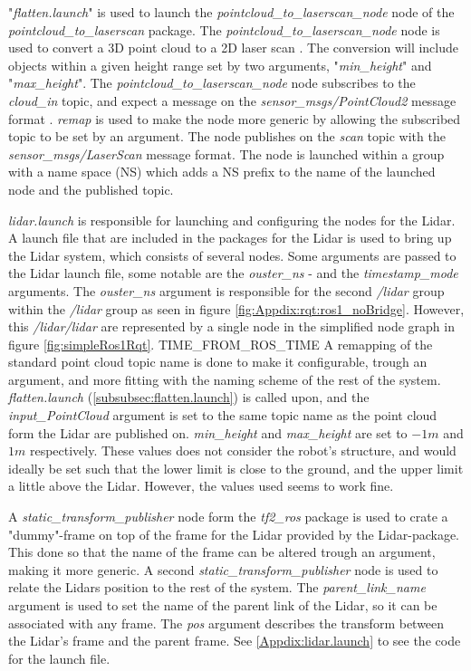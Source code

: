 \label{subsubsec:flatten.launch}
"\textit{flatten.launch}" is used to launch the \textit{pointcloud\_to\_laserscan\_node} 
node of the \textit{pointcloud\_to\_laserscan} package. The \textit{pointcloud\_to\_laserscan\_node} node is used to convert a 3D point cloud to a 2D laser scan \cite{pcl_ros}. The conversion will include objects within a given height range set by two arguments, "\textit{min\_height}" and "\textit{max\_height}". The \textit{pointcloud\_to\_laserscan\_node} node subscribes to the \textit{cloud\_in} topic, and expect a message on the \textit{sensor\_msgs/PointCloud2} message format \cite{pcl_ros}. \textit{remap} is used to make the node more generic by allowing the subscribed topic to be set by an argument. The node publishes on the \textit{scan} topic with the \textit{sensor\_msgs/LaserScan} message format. The node is launched within a group with a name space (NS) which adds a NS prefix to the name of the launched node and the published topic.

\label{subsubsec:lidar.launch}
\textit{lidar.launch} is responsible for launching and configuring the nodes for the Lidar. A launch file that are included in the packages for the Lidar is used to bring up the Lidar system, which  consists of several nodes. Some arguments are passed to the Lidar launch file, some notable are the \textit{ouster\_ns} - and the  \textit{timestamp\_mode} arguments. The \textit{ouster\_ns} argument is responsible for the second \textit{/lidar} group within the \textit{/lidar} group as seen in figure \ref{fig:Appdix:rqt:ros1_noBridge}. However, this \textit{/lidar/lidar} are represented by a single node in the simplified node graph in figure \ref{fig:simpleRos1Rqt}. TIME\_FROM\_ROS\_TIME A remapping of the standard point cloud topic name is done to make it configurable, trough an argument, and more fitting with the naming scheme of the rest of the system. \textit{flatten.launch} (\ref{subsubsec:flatten.launch}) is called upon, and the \textit{input\_PointCloud} argument is set to the same topic name as the point cloud form the Lidar are published on. \textit{min\_height} and \textit{max\_height} are set to $-1 m$ and $1 m$ respectively. These values does not consider the robot's structure, and would ideally be set such that the lower limit is close to the ground, and the upper limit a little above the Lidar. However, the values used seems to work fine. 

A \textit{static\_transform\_publisher} node form the \textit{tf2\_ros} package is used to crate a "dummy"-frame on top of the frame for the Lidar provided by the Lidar-package. This done so that the name of the frame can be altered trough an argument, making it more generic. A second \textit{static\_transform\_publisher} node is used to relate the Lidars position to the rest of the system. The \textit{parent\_link\_name} argument is used to set the name of the parent link of the Lidar, so it can be associated with any frame. The \textit{pos} argument describes the transform between the Lidar's frame and the parent frame. See \ref{Appdix:lidar.launch} to see the code for the launch file.

